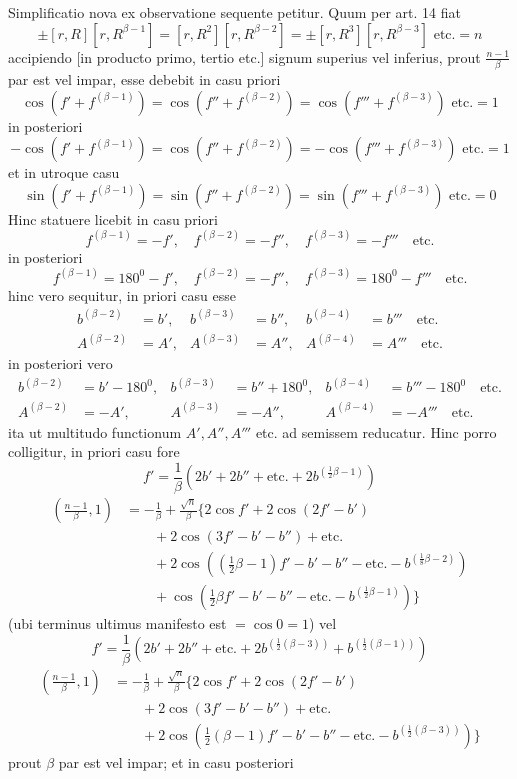 Simplificatio nova ex observatione sequente petitur. Quum per art. 14 fiat
\[
\pm[r,R][r,R^{\beta-1}]=[r,R^2][r,R^{\beta-2}]=\pm[r,R^3][r,R^{\beta-3}]\text{ etc.}=n
\]
accipiendo [in producto primo, tertio etc.] signum superius vel inferius, prout $\frac{n-1}\beta$ par est vel impar, esse debebit in casu priori
\[
\cos(f'+f^{(\beta-1)})=\cos(f''+f^{(\beta-2)})=\cos(f'''+f^{(\beta-3)})\text{ etc.}=1
\]
in posteriori
\[
-\cos(f'+f^{(\beta-1)})=\cos(f''+f^{(\beta-2)})=-\cos(f'''+f^{(\beta-3)})\text{ etc.}=1
\]
et in utroque casu
\[
\sin(f'+f^{(\beta-1)})=\sin(f''+f^{(\beta-2)})=\sin(f'''+f^{(\beta-3)})\text{ etc.}=0
\]
Hinc statuere licebit in casu priori
\[
f^{(\beta-1)}=-f',\quad f^{(\beta-2)}=-f'',\quad f^{(\beta-3)}=-f'''\quad\text{etc.}
\]
in posteriori
\[
f^{(\beta-1)}=180^0-f',\quad f^{(\beta-2)}=-f'',\quad f^{(\beta-3)}=180^0-f'''\quad\text{etc.}
\]
hinc vero sequitur, in priori casu esse
\[
\begin{aligned}
b^{(\beta-2)}&=b',&b^{(\beta-3)}&=b'',&b^{(\beta-4)}&=b'''\quad\text{etc.}\\
A^{(\beta-2)}&=A',&A^{(\beta-3)}&=A'',&A^{(\beta-4)}&=A'''\quad\text{etc.}
\end{aligned}
\]
in posteriori vero
\[
\begin{aligned}
b^{(\beta-2)}&=b'-180^0,&b^{(\beta-3)}&=b''+180^0,&b^{(\beta-4)}&=b'''-180^0\quad\text{etc.}\\
A^{(\beta-2)}&=-A',&A^{(\beta-3)}&=-A'',&A^{(\beta-4)}&=-A'''\quad\text{etc.}
\end{aligned}
\]
ita ut multitudo functionum $A',A'',A'''$ etc. ad semissem reducatur. Hinc porro colligitur, in priori casu fore
\[
f'=\frac1\beta(2b'+2b''+\text{etc.}+2b^{(\frac12\beta-1)})
\]
\[
\begin{aligned}
\left(\frac{n-1}\beta,1\right)&=-\frac1\beta+\frac{\surd n}\beta\{2\cos f'+2\cos(2f'-b')\\
&\qquad+2\cos(3f'-b'-b'')+\text{etc.}\\
&\qquad+2\cos((\tfrac12\beta-1)f'-b'-b''-\text{etc.}-b^{(\frac18\beta-2)})\\
&\qquad+\cos(\tfrac12\beta f'-b'-b''-\text{etc.}-b^{(\frac12\beta-1)})\}
\end{aligned}
\]
(ubi terminus ultimus manifesto est $=\cos0=1$) vel
\[
f'=\frac1\beta(2b'+2b''+\text{etc.}+2b^{(\frac12(\beta-3))}+b^{(\frac12(\beta-1))})
\]
\[
\begin{aligned}
\left(\frac{n-1}\beta,1\right)&=-\frac1\beta+\frac{\surd n}\beta\{2\cos f'+2\cos(2f'-b')\\
&\qquad+2\cos(3f'-b'-b'')+\text{etc.}\\
&\qquad+2\cos(\tfrac12(\beta-1)f'-b'-b''-\text{etc.}-b^{(\frac12(\beta-3))})\}
\end{aligned}
\]
prout $\beta$ par est vel impar; et in casu posteriori

